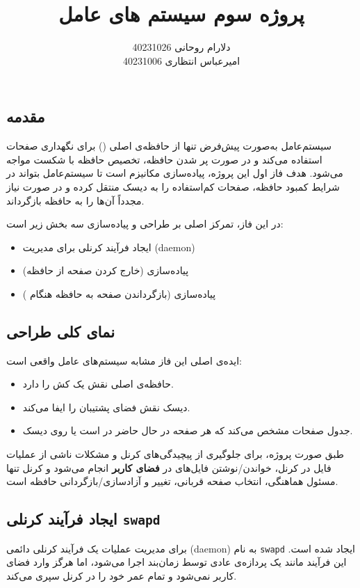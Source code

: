 \documentclass[12pt]{article}
\title {پروژه سوم سیستم های عامل}
\author {دلارام روحانی 40231026 \\
        امیرعباس انتظاری 40231006}
\begin{document}
\maketitle
\tableofcontents
\newpage

\section{}

\subsection{مقدمه}
سیستم‌عامل  به‌صورت پیش‌فرض تنها از حافظه‌ی اصلی () برای نگهداری صفحات استفاده می‌کند و در صورت پر شدن حافظه، تخصیص حافظه با شکست مواجه می‌شود. هدف فاز اول این پروژه، پیاده‌سازی مکانیزم  است تا سیستم‌عامل بتواند در شرایط کمبود حافظه، صفحات کم‌استفاده را به دیسک منتقل کرده و در صورت نیاز مجدداً آن‌ها را به حافظه بازگرداند.

در این فاز، تمرکز اصلی بر طراحی و پیاده‌سازی سه بخش زیر است:
\begin{itemize}
  \item ایجاد فرآیند کرنلی برای مدیریت  (daemon)
  \item پیاده‌سازی  (خارج کردن صفحه از حافظه)
  \item پیاده‌سازی  (بازگرداندن صفحه به حافظه هنگام )
\end{itemize}

\subsection{نمای کلی طراحی}
ایده‌ی اصلی این فاز مشابه سیستم‌های عامل واقعی است:
\begin{itemize}
  \item حافظه‌ی اصلی نقش یک کش را دارد.
  \item دیسک نقش فضای پشتیبان  را ایفا می‌کند.
  \item جدول صفحات مشخص می‌کند که هر صفحه در حال حاضر در  است یا روی دیسک.
\end{itemize}

طبق صورت پروژه، برای جلوگیری از پیچیدگی‌های کرنل و مشکلات ناشی از عملیات فایل در کرنل، خواندن/نوشتن فایل‌های  در \textbf{فضای کاربر} انجام می‌شود و کرنل تنها مسئول هماهنگی، انتخاب صفحه قربانی، تغییر  و آزادسازی/بازگردانی حافظه است.

\subsection{ایجاد فرآیند کرنلی \texttt{swapd}}
برای مدیریت عملیات  یک فرآیند کرنلی دائمی (daemon) به نام \texttt{swapd} ایجاد شده است. این فرآیند مانند یک پردازه‌ی عادی توسط زمان‌بند اجرا می‌شود، اما هرگز وارد فضای کاربر نمی‌شود و تمام عمر خود را در کرنل سپری می‌کند.
\end{document}
